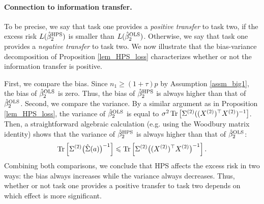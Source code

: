 





\paragraph{Connection to information transfer.} To be precise, we say that task one provides a \textit{positive transfer} to task two, if the excess risk $L(\hat{\beta}_2^{\textup{HPS}})$ is smaller than $L(\hat{\beta}_2^{\textup{OLS}})$.
Otherwise, we say that task one provides a \textit{negative transfer} to task two.
We now illustrate that the bias-variance decomposition of Proposition \ref{lem_HPS_loss} characterizes whether or not the information transfer is positive.

First, we compare the bias. Since $n_1 \ge (1 + \tau) p$ by Assumption \ref{assm_big1}, the bias of $\hat{\beta}_2^{\textup{OLS}}$ is zero.
Thus, the bias of $\hat{\beta}_2^{\textup{HPS}}$ is always higher than that of $\hat{\beta}_2^{\textup{OLS}}$.
Second, we compare the variance. By a similar argument as in Proposition \ref{lem_HPS_loss}, the variance of $\hat{\beta}_2^{\textup{OLS}}$ is equal to $\sigma^2 \operatorname{Tr}\left[\Sigma^{(2)} ((X^{(2)})^{\top} X^{(2)})^{-1}\right]$.
Then, a straightforward algebraic calculation (e.g. using the Woodbury matrix identity) shows that the variance of $\hat{\beta}_2^{\textup{HPS}}$ is always higher than that of $\hat{\beta}_2^{\textup{OLS}}$:
\begin{align*}
    \operatorname{Tr}\left[\Sigma^{(2)} \big(\hat{\Sigma}(a)\big)^{-1}\right] \leqslant \operatorname{Tr}\left[\Sigma^{(2)} \big((X^{(2)})^{\top} X^{(2)}\big)^{-1}\right].
\end{align*}
Combining both comparisons, we conclude that HPS affects the excess risk in two ways: the bias always increases while the variance always decreases.
Thus, whether or not task one provides a positive transfer to task two depends on which effect is more significant.

